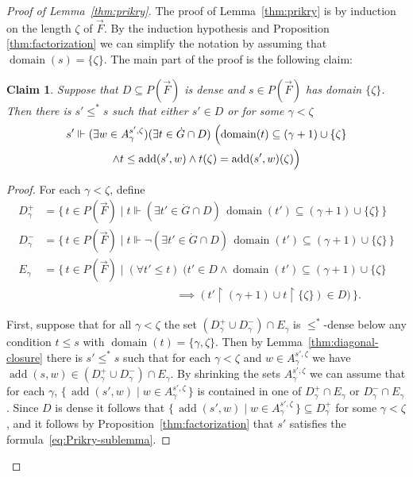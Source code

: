 \documentclass[
twoside,
]{article}
\newtheorem{claim}{Claim}[theorem]
\theoremstyle{definition}
\theoremstyle{remark}
\DeclareMathOperator{\add}{add}
\newcommand{\forces}{\Vdash}
\newcommand{\sing}[1]{\{#1\}}
\newcommand{\set}[1]{\{\,#1\,\}}
\newcommand{\restrict}{{\upharpoonright}}
\DeclareMathOperator{\domain}{domain}
\begin{document}
\begin{proof}[Proof of Lemma~\ref{thm:prikry}]
 
  The proof of Lemma~\ref{thm:prikry} is by induction on the length
  $\zeta$ of $\vec F$.   By the induction hypothesis and Proposition
  \ref{thm:factorization}
  we can simplify the notation by assuming that $\domain(s)=\sing{\zeta}$.
  The main part of the proof is the following claim:
  \begin{claim}
    \label{thm:Prikry-sublemma}
    Suppose that $D\subseteq P(\vec F)$ is dense and $s\in P(\vec F)$
    has domain $\sing{\zeta}$.  Then there is $s'\leq^* s$ such
    that either $s'\in D$ or for some $\gamma<\zeta$
    \begin{multline}
      \label{eq:Prikry-sublemma}
      s'\forces (\exists w\in A^{s',\zeta}_{\gamma})(\exists t\in \dot
      G\cap D)\;\Bigl(\domain(t)\subseteq
      (\gamma+1)\cup\sing\zeta\\
      \land t\leq\add(s',w)\land 
      t(\zeta)=\add(s',w)(\zeta)\Bigr)
    \end{multline}
  \end{claim}

  \begin{proof}
    For each $\gamma<\zeta$, define
    \begin{align*}
      D^{+}_{\gamma}&=\set{t\in P(\vec F)\mid t\forces(\exists t'\in\dot G\cap
                      D)\,\domain(t')\subseteq(\gamma+1)\cup\sing{\zeta}}
      \\
      D^{-}_{\gamma}&=\set{t\in P(\vec F)\mid t\forces\lnot(\exists t'\in\dot G\cap
                      D)\,\domain(t')\subseteq(\gamma+1)\cup\sing{\zeta}}
      \\
      E_{\gamma}&=
                  \set{t\in P(\vec F)\mid
                  (\forall t'\leq t)\;
                  \bigl( t'\in
                  D\land\domain(t')\subseteq(\gamma+1)\cup\sing\zeta
      \\&\hspace{5cm}  \implies (t'\restrict(\gamma+1)\cup 
          t\restrict\sing{\zeta})\in D\bigr)}.
    \end{align*}

    First, suppose that for all  $\gamma<\zeta$ the set 
    $(D^{+}_{\gamma}\cup D^{-}_{\gamma})\cap E_{\gamma}$ is $\leq^*$-dense below
    any condition $t\leq s$ with $\domain(t)=\sing{\gamma,\zeta}$.
    Then by Lemma~\ref{thm:diagonal-closure} there is $s'\leq^* s$
    such that for each $\gamma<\zeta$ and $w\in A^{s',\zeta}_{\gamma}$ we have  $\add(s,w)\in
    (D^{+}_{\gamma}\cup D^{-}_{\gamma})\cap E_{\gamma}$.   By shrinking the sets
    $A^{s',\zeta}_{\gamma}$ we can assume that for each $\gamma$,
    $\set{\add(s',w)\mid w\in A^{s',\zeta}_{\gamma}}$ is contained in one
    of $D^{+}_{\gamma}\cap E_\gamma$ or $D^{-}_{\gamma}\cap E_{\gamma}$.  Since $D$ is
    dense it follows that $\set{\add(s',w)\mid w\in
      A^{s',\zeta}_{\gamma}}\subseteq D^{+}_{\gamma}$ for some
    $\gamma<\zeta$, and it follows by
    Proposition~\ref{thm:factorization} that $s'$ satisfies the formula~\eqref{eq:Prikry-sublemma}.


\end{proof}
\end{proof}
\end{document}
